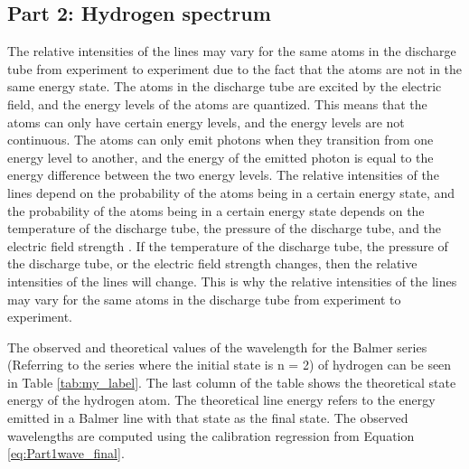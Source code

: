 
\subsection{Part 2: Hydrogen spectrum}



The relative intensities of the lines may vary for the same atoms in the discharge tube from experiment to experiment due to the fact that the atoms are not in the same energy state.
The atoms in the discharge tube are excited by the electric field, and the energy levels of the atoms are quantized.
This means that the atoms can only have certain energy levels, and the energy levels are not continuous.
The atoms can only emit photons when they transition from one energy level to another, and the energy of the emitted photon is equal to the energy difference between the two energy levels.
The relative intensities of the lines depend on the probability of the atoms being in a certain energy state, and the probability of the atoms being in a certain energy state depends on the temperature of the discharge tube,
the pressure of the discharge tube, and the electric field strength \cite{phy293_rydberg_nodate, foguelPressureLowTemperature1992}. If the temperature of the discharge tube, the pressure of the discharge tube, or the electric field strength changes, then the relative intensities of the lines will change.
This is why the relative intensities of the lines may vary for the same atoms in the discharge tube from experiment to experiment.

The observed and theoretical values of the wavelength for the Balmer series (Referring to the series where the initial state is n = 2) of hydrogen can be seen in Table \ref{tab:my_label}.
The last column of the table shows the theoretical state energy of the hydrogen atom. The theoretical line energy refers to the energy emitted in a Balmer line with that state as the final state.
The observed wavelengths are computed using the calibration regression from Equation \ref{eq:Part1wave_final}.


